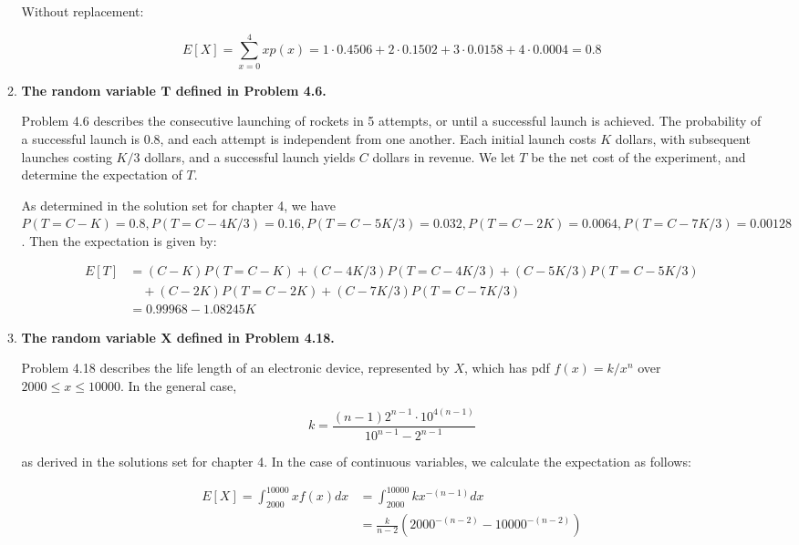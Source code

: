 \documentclass[10pt, oneside]{article}
\begin{document}
\begin{enumerate}[label=7.\arabic*]
\begin{enumerate}
	Without replacement:
	
	\[ E[X] = \sum^4_{x=0} x p(x) = 1 \cdot 0.4506 + 2 \cdot 0.1502 + 3 \cdot 0.0158 + 4 \cdot 0.0004 = \boxed{0.8} \]
	
	\item  \begin{tcolorbox}[
	  colback=Cerulean!5!white,
	  colframe=Cerulean!75!black]
	\textbf{The random variable $\bm{T}$ defined in Problem 4.6.}
	\end{tcolorbox}
	
	Problem 4.6 describes the consecutive launching of rockets in 5 attempts, or until a successful launch is achieved. The probability of a successful launch is 0.8, and each attempt is independent from one another. Each initial launch costs $K$ dollars, with subsequent launches costing $K/3$ dollars, and a successful launch yields $C$ dollars in revenue. We let $T$ be the net cost of the experiment, and determine the expectation of $T$.
	
	As determined in the solution set for chapter 4, we have $P(T = C-K) = 0.8, P(T = C - 4K/3) = 0.16, P(T = C - 5K/3) = 0.032, P(T = C - 2K) = 0.0064, P(T = C - 7K/3) = 0.00128$. Then the expectation is given by:
	
	\begin{align*}
	E[T] &= (C-K) P(T = C-K) + (C - 4K/3) P(T = C - 4K/3) + (C - 5K/3) P(T = C - 5K/3) \\ 
	&\quad + (C - 2K) P(T = C - 2K) + (C - 7K/3) P(T = C - 7K/3) \\
	&= \boxed{0.99968 - 1.08245 K}
	\end{align*}
	
	\item  \begin{tcolorbox}[
	  colback=Cerulean!5!white,
	  colframe=Cerulean!75!black]
	\textbf{The random variable $\bm{X}$ defined in Problem 4.18.}
	\end{tcolorbox}
	
	Problem 4.18 describes the life length of an electronic device, represented by $X$, which has pdf $f(x) = k / x^n$ over $2000 \leq x \leq 10000$. In the general case,
	
	\[ k = \frac{(n-1) 2^{n-1} \cdot 10^{4(n-1)}}{10^{n-1} - 2^{n-1}} \]
	
	as derived in the solutions set for chapter 4. In the case of continuous variables, we calculate the expectation as follows:
	
	\begin{align*}
	E[X] = \int^{10000}_{2000} x f(x) dx &= \int^{10000}_{2000} kx^{-(n-1)} dx \\
	&= \boxed{ \frac{k}{n-2} (2000^{-(n-2)} - 10000^{-(n-2)})  }
	\end{align*}
	

\end{enumerate}
\end{enumerate}
\end{document}
